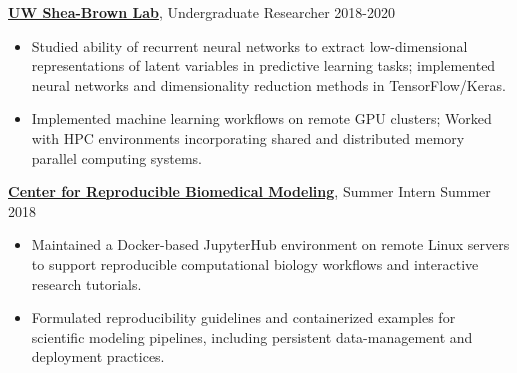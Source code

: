 {\href{http://faculty.washington.edu/etsb/}{\bf{UW Shea-Brown Lab}}}, Undergraduate Researcher  \hfill 2018-2020
\vspace{0.2pt}
\begin{itemize}
\setlength\itemsep{0em}
\item[$\circ$] Studied ability of recurrent neural networks to extract low-dimensional representations of latent variables in predictive learning tasks; implemented neural networks and dimensionality reduction methods in TensorFlow/Keras.
\item[$\circ$] Implemented machine learning workflows on remote GPU clusters; Worked with HPC environments incorporating shared and distributed memory parallel computing systems.
\end{itemize}

{\href{https://reproduciblebiomodels.org/}{\bf{Center for Reproducible Biomedical Modeling}},} Summer Intern  \hfill Summer 2018 
\vspace{0.2pt}
\begin{itemize}
\setlength\itemsep{0em}
\item[$\circ$] Maintained a Docker-based JupyterHub environment on remote Linux servers to support reproducible computational biology workflows and interactive research tutorials.

\item[$\circ$] Formulated reproducibility guidelines and containerized examples for scientific modeling pipelines, including persistent data-management and deployment practices.
\end{itemize}

\endinput
